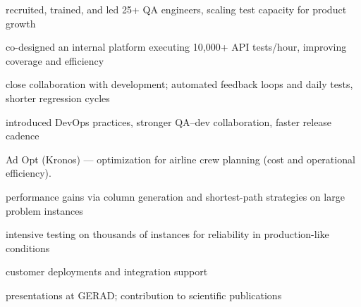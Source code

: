 \begin{cvitemize}
  \item {} recruited, trained, and led 25+ QA engineers, scaling test capacity for product growth
  \item {} co-designed an internal platform executing 10,000+ API tests/hour, improving coverage and efficiency
  \item {} close collaboration with development; automated feedback loops and daily tests, shorter regression cycles
  \item {} introduced DevOps practices, stronger QA--dev collaboration, faster release cadence
\end{cvitemize}

\cvJobSeparator


Ad Opt (Kronos) --- optimization for airline crew planning (cost and operational efficiency).

\begin{cvitemize}
  \item {} performance gains via column generation and shortest-path strategies on large problem instances
  \item {} intensive testing on thousands of instances for reliability in production-like conditions
  \item {} customer deployments and integration support
  \item {} presentations at GERAD; contribution to scientific publications
\end{cvitemize}
